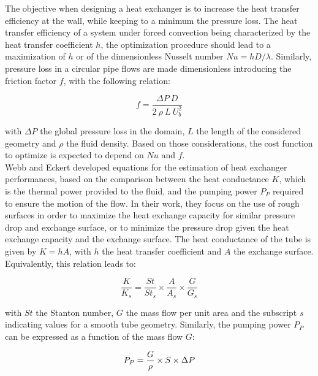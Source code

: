The objective when designing a heat exchanger is to increase the heat transfer efficiency at the wall, while keeping to a minimum the pressure loss. The heat transfer efficiency of a system under forced convection being characterized by the heat transfer coefficient $h$, the optimization procedure should lead to a maximization of $h$ or of the dimensionless Nusselt number $Nu = hD/\lambda$. Similarly, pressure loss in a circular pipe flows are made dimensionless introducing the friction factor $f$, with the following relation:

\begin{equation}
f = \frac{\Delta P ~ D}{2 ~ \rho ~ L ~ U_b^2}
\label{friction_f}
\end{equation}

\noindent with $\Delta P$ the global pressure loss in the domain, $L$ the length of the considered geometry and $\rho$ the fluid density. Based on those considerations, the cost function to optimize is expected to depend on $Nu$ and $f$.\\

Webb and Eckert \cite{webb1972} developed equations for the estimation of heat exchanger performances, based on the comparison between the heat conductance $K$, which is the thermal power provided to the fluid, and the pumping power $P_{P}$ required to ensure the motion of the flow. In their work, they focus on the use of rough surfaces in order to maximize the heat exchange capacity for similar pressure drop and exchange surface, or to minimize the pressure drop given the heat exchange capacity and the exchange surface. The heat conductance of the tube is given by $K=hA$, with $h$ the heat transfer coefficient and $A$ the exchange surface. Equivalently, this relation leads to:

\begin{equation}
\frac{K}{K_s} = \frac{St}{St_s} \times \frac{A}{A_s} \times \frac{G}{G_s}
\label{heat_conduct}
\end{equation}

\noindent with $St$ the Stanton number, $G$ the mass flow per unit area and the subscript $s$ indicating values for a smooth tube geometry. Similarly, the pumping power $P_{P}$ can be expressed as a function of the mass flow $G$:

\begin{equation}
P_{P} = \frac{G}{\rho} \times S \times \Delta P\\
\label{pump_pow}
\end{equation}

